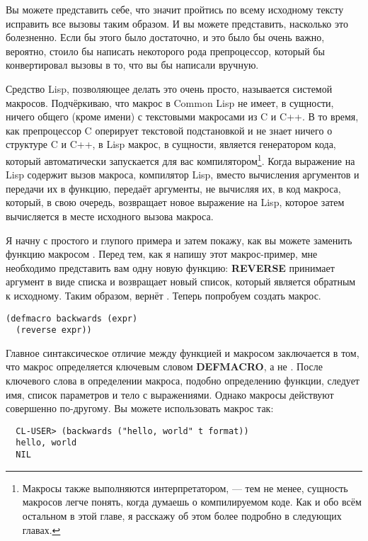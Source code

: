 Вы можете представить себе, что значит пройтись по всему исходному тексту исправить все
вызовы  таким образом. И вы можете представить, насколько это болезненно. Если
бы этого было достаточно, и это было бы очень важно, вероятно, стоило бы написать
некоторого рода препроцессор, который бы конвертировал вызовы  в то, что вы бы
написали вручную.

Средство Lisp, позволяющее делать это очень просто, называется системой
макросов. Подчёркиваю, что макрос в Common Lisp не имеет, в сущности, ничего общего (кроме
имени) с текстовыми макросами из C и C++. В то время, как препроцессор C оперирует
текстовой подстановкой и не знает ничего о структуре C и C++, в Lisp макрос, в сущности,
является генератором кода, который автоматически запускается для вас
компилятором\footnote{Макросы также выполняются интерпретатором, --- тем не менее,
  сущность макросов легче понять, когда думаешь о компилируемом коде. Как и обо всём
  остальном в этой главе, я расскажу об этом более подробно в следующих главах.}. Когда
выражение на Lisp содержит вызов макроса, компилятор Lisp, вместо вычисления аргументов и
передачи их в функцию, передаёт аргументы, не вычисляя их, в код макроса, который, в свою
очередь, возвращает новое выражение на Lisp, которое затем вычисляется в месте исходного
вызова макроса.

Я начну с простого и глупого примера и затем покажу, как вы можете заменить функцию
 макросом . Перед тем, как я напишу этот макрос-пример, мне
необходимо представить вам одну новую функцию: \textbf{REVERSE} принимает аргумент в виде
списка и возвращает новый список, который является обратным к исходному. Таким образом,
 вернёт . Теперь попробуем создать макрос.

\begin{lstlisting}
(defmacro backwards (expr)
  (reverse expr))
\end{lstlisting}

Главное синтаксическое отличие между функцией и макросом заключается в том, что макрос
определяется ключевым словом \textbf{DEFMACRO}, а не . После ключевого слова в
определении макроса, подобно определению функции, следует имя, список параметров и тело с
выражениями. Однако макросы действуют совершенно по-другому. Вы можете использовать макрос
так:

\begin{verbatim}
  CL-USER> (backwards ("hello, world" t format))
  hello, world
  NIL
\end{verbatim}

